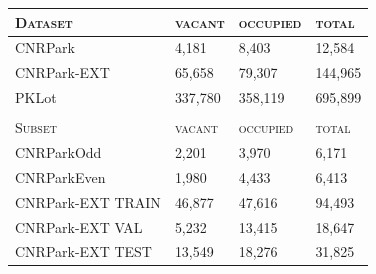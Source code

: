 \begin{table}
\begin{tabularx}{\linewidth}{lRRR}
\toprule
\textsc{Dataset}    & \textsc{vacant} & \textsc{occupied} & \textsc{total} \\
\midrule

     CNRPark           & 4,181          & 8,403          & 12,584          \\
     CNRPark-EXT       & 65,658         & 79,307         & 144,965         \\
     PKLot             & 337,780        & 358,119        & 695,899         \\ %
\bottomrule
                       &               &               &                \\
\toprule
\textsc{Subset} & \textsc{vacant} & \textsc{occupied} & \textsc{total} \\ \midrule
    CNRParkOdd        & 2,201          & 3,970          & 6,171           \\
    CNRParkEven       & 1,980          & 4,433          & 6,413           \\ %
\midrule
     CNRPark-EXT TRAIN     & 46,877         & 47,616         & 94,493          \\
     CNRPark-EXT VAL       & 5,232          & 13,415         & 18,647          \\
     CNRPark-EXT TEST      & 13,549         & 18,276         & 31,825          \\ %

\end{tabularx}
\end{table}
